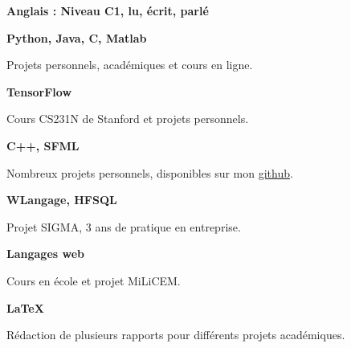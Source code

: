 \textbf{Anglais : Niveau C1, lu, \'ecrit, parl\'e}

\medskip

\textbf{Python, Java, C, Matlab}

Projets personnels, acad\'emiques et cours en ligne.

\medskip

\textbf{TensorFlow}

Cours CS231N de Stanford et projets personnels.

\medskip

\textbf{C++, SFML}

Nombreux projets personnels, disponibles sur mon \href{https://github.com/ThomasRanvier}{github}.

\medskip

\textbf{WLangage, HFSQL}

Projet SIGMA, 3 ans de pratique en entreprise.

\medskip

\textbf{Langages web}

Cours en \'ecole et projet MiLiCEM.

\medskip

\textbf{\LaTeX}

R\'edaction de plusieurs rapports pour diff\'erents projets académiques.

\medskip
